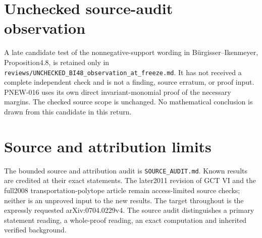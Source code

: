 \documentclass[11pt]{article}
\theoremstyle{definition}\newtheorem{definition}[theorem]{Definition}
\theoremstyle{remark}\newtheorem{remark}[theorem]{Remark}
\begin{document}
\section{Unchecked source-audit observation}
A late candidate test of the nonnegative-support wording in
B\"urgisser--Ikenmeyer, Proposition4.8, is retained only in
\nolinkurl{reviews/UNCHECKED_BI48_observation_at_freeze.md}.
It has not received a complete independent check and is not a finding,
source erratum, or proof input. PNEW-016 uses its own direct
invariant-monomial proof of the necessary margins. The checked source
scope is unchanged. No mathematical conclusion is drawn from this
candidate in this return.

\section{Source and attribution limits}
The bounded source and attribution audit is \texttt{SOURCE\_AUDIT.md}.
Known results are credited at their exact statements.  The later2011
revision of GCT VI and the full2008 transportation-polytope article
remain access-limited source checks; neither is an unproved input to
the new results.  The target throughout is the expressly requested
arXiv:0704.0229v4.  The source audit distinguishes a primary statement
reading, a whole-proof reading, an exact computation and inherited
verified background.
\end{document}
